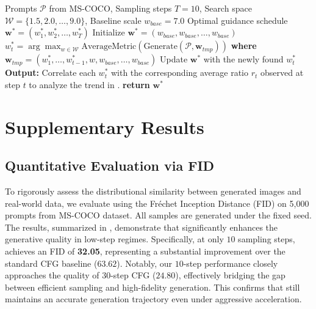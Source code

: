 \begin{algorithm}[t]
\caption{Greedy Search for Step-wise Optimal Guidance Scale}
\label{alg:greedy_search}
\begin{algorithmic}[1]
\REQUIRE Prompts $\mathcal{P}$ from MS-COCO, Sampling steps $T=10$, Search space $\mathcal{W} = \{1.5, 2.0, \dots, 9.0\}$, Baseline scale $w_{base} = 7.0$
\ENSURE Optimal guidance schedule $\mathbf{w}^* = (w^*_1, w^*_2, \dots, w^*_T)$
\STATE Initialize $\mathbf{w}^* = (w_{base}, w_{base}, \dots, w_{base})$ 
    \STATE {}
    \STATE $w^*_t = \arg\max_{w \in \mathcal{W}} \text{AverageMetric}\left( \text{Generate}(\mathcal{P}, \mathbf{w}_{tmp}) \right)$
    \STATE \textbf{where} $\mathbf{w}_{tmp} = (w^*_1, \dots, w^*_{t-1}, w, w_{base}, \dots, w_{base})$
    \STATE Update $\mathbf{w}^*$ with the newly found $w^*_t$
\ENDFOR
\STATE \textbf{Output:} Correlate each $w^*_t$ with the corresponding average ratio $r_t$ observed at step $t$ to analyze the trend in .
\STATE \textbf{return} $\mathbf{w}^*$
\end{algorithmic}
\end{algorithm}

\section{Supplementary Results}

\subsection{Quantitative Evaluation via FID}
\label{app:exp_fid}

To rigorously assess the distributional similarity between generated images and real-world data, we evaluate \mtdbk using the Fr\'echet Inception Distance (FID) on 5,000 prompts from MS-COCO dataset. All samples are generated under the fixed seed. The results, summarized in , demonstrate that \mtdbk significantly enhances the generative quality in low-step regimes. Specifically, at only $10$ sampling steps, \mtdbk achieves an FID of \textbf{32.05}, representing a substantial improvement over the standard CFG baseline ($63.62$). Notably, our $10$-step performance closely approaches the quality of $30$-step CFG ($24.80$), effectively bridging the gap between efficient sampling and high-fidelity generation. This confirms that \mtdbk still maintains an accurate generation trajectory even under aggressive acceleration.

